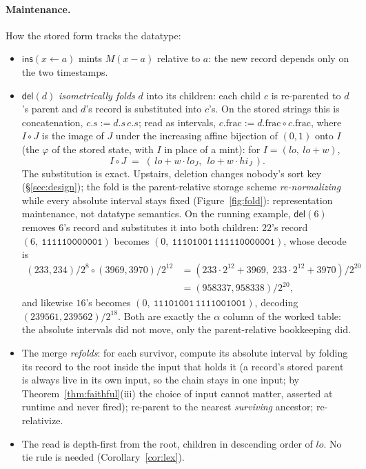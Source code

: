\documentclass[11pt]{article}
\newcommand{\code}[1]{\texttt{#1}}
\newcommand{\del}{\mathsf{del}}
\newcommand{\ins}{\mathsf{ins}}
\begin{document}
\paragraph{Maintenance.} How the stored form tracks the datatype:
\begin{itemize}
\item $\ins(x \leftarrow a)$ mints $M(x - a)$ relative to $a$: the
new record depends only on the two timestamps.
\item $\del(d)$ \emph{isometrically folds} $d$ into its children:
each child $c$ is re-parented to $d$'s parent and $d$'s record is
substituted into $c$'s. On the stored strings this is concatenation,
$c.s := d.s\, c.s$; read as intervals, $c.\mathrm{frac} :=
d.\mathrm{frac} \circ c.\mathrm{frac}$, where $I \circ J$ is the
image of $J$ under the increasing affine bijection of $(0,1)$ onto
$I$ (the $\varphi$ of the stored state, with $I$ in place of a
mint): for $I = (lo,\ lo + w)$,
\[
  I \circ J \;=\; (\,lo + w \cdot lo_J,\ \ lo + w \cdot hi_J\,).
\]
The substitution is exact. Upstairs, deletion
changes nobody's sort key (\S\ref{sec:design}); the fold is the
parent-relative storage scheme \emph{re-normalizing} while every
absolute interval stays fixed (Figure~\ref{fig:fold}):
representation maintenance, not datatype semantics. On the running
example, $\del(6)$ removes $6$'s record and substitutes it into both
children: $22$'s record $(6,\ \code{111110000001})$ becomes
$(0,\ \code{11101001}\,\code{111110000001})$, whose decode is
\begin{align*}
  (233, 234)/2^{8} \circ (3969, 3970)/2^{12}
  &= (233 \cdot 2^{12} + 3969,\ 233 \cdot 2^{12} + 3970)/2^{20}\\
  &= (958337, 958338)/2^{20},
\end{align*}
and likewise $16$'s becomes $(0,\
\code{11101001}\,\code{1111001001})$, decoding $(239561,
239562)/2^{18}$. Both are exactly the $\alpha$ column of the worked
table: the absolute intervals did not move, only the
parent-relative bookkeeping did.
\item The merge \emph{refolds}: for each survivor, compute its
absolute interval by folding its record to the root inside the input
that holds it (a record's stored parent is always live in its own
input, so the chain stays in one input; by
Theorem~\ref{thm:faithful}(iii) the choice of input cannot matter,
asserted at runtime and never fired); re-parent to the nearest
\emph{surviving} ancestor; re-relativize.
\item The read is depth-first from the root, children in descending
order of $lo$. No tie rule is needed (Corollary~\ref{cor:lex}).
\end{itemize}
\end{document}
